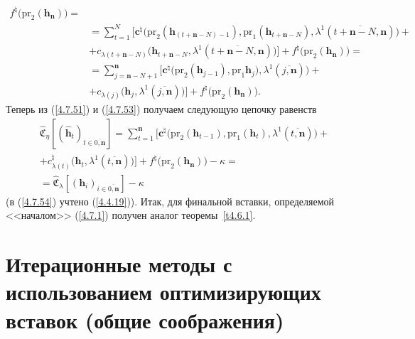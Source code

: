 \documentclass[11pt,twoside,openany]{report}
\newcommand{\ov}{\overline}
\newcommand{\la}{\lambda}
\newcommand{\zc}{{\mathbf c}}
\newcommand{\nn}{{\mathbf n}}
\begin{document}
{{\begin{eqnarray}
f^\natural\bigl(\mathrm{pr}_2(\mathbf{h}_\nn)\bigl)=
&\nonumber\\
&= \sum\limits_{t=1}^N\bigl[\zc^\natural\bigl(\mathrm{pr}_2(\mathbf{h}_{(t+\nn-N)-1}),\mathrm{pr}_1
(\mathbf{h}_{t+\nn-N}),\la^1(\ov{t+\nn-N,\nn})\bigl)+
&\nonumber\\
&+c_{\la(t+\nn-N)}\bigl(\mathbf{h}_{t+\nn-N},\la^1(\ov{t+\nn-N,\nn})\bigl)\bigl]+
f^\natural\bigl(\mathrm{pr}_2(\mathbf{h}_\nn)\bigl)=
&\nonumber\\
&= \sum\limits_{j=\nn-N+1}^\nn\bigl[\zc^\natural\bigl(\mathrm{pr}_2(\mathbf{h}_{j-1}),\mathrm{pr}_1
\mathbf{h}_j),\la^1(\ov{j,\nn})\bigl) +
&\nonumber\\
&+c_{\la(j)}\bigl(\mathbf{h}_j,\la^1(\ov{j,\nn})\bigl)\bigl]+
f^\natural\bigl(\mathrm{pr}_2(\mathbf{h}_\nn)\bigl).
&\label{4.7.53}
\end{eqnarray}
Теперь из (\ref{4.7.51}) и (\ref{4.7.53}) получаем следующую цепочку равенств
\begin{eqnarray}
&\widehat{\mathfrak{C}}_\eta[(\hat{\mathbf{h}}_t)_{t\in\ov{0,\nn}}] =
\sum\limits_{t=1}^\nn\bigl[\zc^\natural\bigl(\mathrm{pr}_2(\mathbf{h}_{t-1}),\mathrm{pr}_1
(\mathbf{h}_t),\la^1(\ov{t,\nn})\bigl) +
&\nonumber\\
&+c_{\la(t)}^\natural\bigl(\mathbf{h}_t,
\la^1(\ov{t,\nn})\bigl)\bigl]+ f^\natural\bigl(\mathrm{pr}_2(\mathbf{h}_\nn)\bigl)- \kappa =
&\nonumber\\
&=\widehat{\mathfrak{C}}_\la[(\mathbf{h}_i)_{i\in\ov{0,\nn}}]-\kappa
&\label{4.7.54}
\end{eqnarray}
(в (\ref{4.7.54}) учтено (\ref{4.4.19})). Итак,   для финальной вставки, определяемой <<началом>>
(\ref{4.7.1}) получен аналог теоремы~\ref{t4.6.1}.

{\raggedright\section{
  Итерационные методы с использованием оптимизирующих вставок (общие соображения)
}}
\label{sect:4.8}
\setcounter{equation}{-1}

}}
\end{document}

